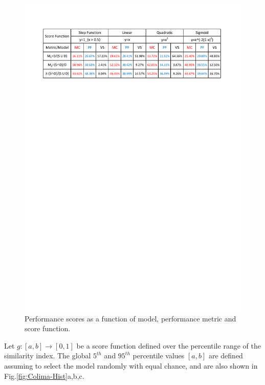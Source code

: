 \documentclass{article}
\begin{document}
\begin{figure}[H]
         \centering
        \includegraphics[width=1\textwidth]{figures/Colima/SuppInfo_table.pdf}
        \caption{Performance scores as a function of model, performance metric and score function.}
\end{figure}

Let $g:[a,b]\rightarrow[0,1]$ be a score function defined over the percentile range of the similarity index. The global $5^{th}$ and $95^{th}$ percentile values $[a,b]$ are defined assuming to select the model randomly with equal chance, and are also shown in Fig.\ref{fig:Colima-Hist}a,b,c.
\end{document}

